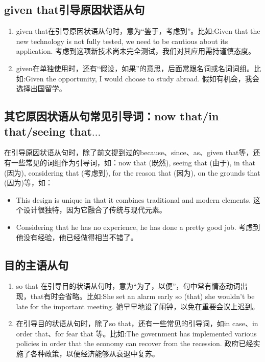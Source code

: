 \subsection{given that引导原因状语从句}

\begin{enumerate}
  \item given that在引导原因状语从句时，意为“鉴于，考虑到”。比如:Given that the new technology is not fully tested, we need to be cautious about its application. 考虑到这项新技术尚未完全测试，我们对其应用需持谨慎态度。
  \item given在单独使用时，还有“假设，如果”的意思，后面常跟名词或名词词组。比如:Given the opportunity, I would choose to study abroad. 假如有机会，我会选择出国留学。
\end{enumerate}

\subsection{其它原因状语从句常见引导词：now that/in that/seeing that\(\ldots\)}

在引导原因状语从句时，除了前文提到过的because、since、as、given that等，还有一些常见的词组作为引导词，如：now that (既然), seeing that (由于), in that (因为), considering that (考虑到), for the reason that (因为), on the grounds that (因为)等，如：
\begin{itemize}
  \item This design is unique in that it combines traditional and modern elements. 这个设计很独特，因为它融合了传统与现代元素。
  \item Considering that he has no experience, he has done a pretty good job. 考虑到他没有经验，他已经做得相当不错了。
\end{itemize}

\subsection{目的主语从句}

\begin{enumerate}
  \item so that 在引导目的状语从句时，意为“为了，以便”，句中常有情态动词出现，that有时会省略。比如:She set an alarm early so (that) she wouldn't be late for the important meeting. 她早早地设了闹钟，以免在重要会议上迟到。
  \item 在引导目的状语从句时，除了so that，还有一些常见的引导词，如in case、in order that、for fear that 等。比如:The government has implemented various policies in order that the economy can recover from the recession. 政府已经实施了各种政策，以便经济能够从衰退中复苏。
\end{enumerate}


